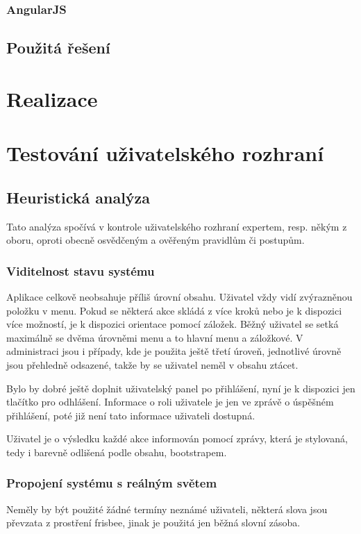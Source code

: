 \documentclass[thesis=B,czech]{FITthesis}[2012/06/26]
\begin{document}
		\subsection{AngularJS}

	\section{Použitá řešení}

\chapter{Realizace}

\chapter{Testování uživatelského rozhraní}
	
	\section{Heuristická analýza}
		Tato analýza spočívá v kontrole uživatelského rozhraní expertem, resp. někým z oboru, oproti obecně osvědčeným a ověřeným pravidlům či postupům. 

		\subsection{Viditelnost stavu systému}
			Aplikace celkově neobsahuje příliš úrovní obsahu. Uživatel vždy vidí zvýrazněnou položku v menu. Pokud se některá akce skládá z více kroků nebo je k dispozici více možností, je k dispozici orientace pomocí záložek. Běžný uživatel se setká maximálně se dvěma úrovněmi menu a to hlavní menu a záložkové. V administraci jsou i případy, kde je použita ještě třetí úroveň, jednotlivé úrovně jsou přehledně odsazené, takže by se uživatel neměl v obsahu ztácet.

			Bylo by dobré ještě doplnit uživatelský panel po přihlášení, nyní je k dispozici jen tlačítko pro odhlášení. Informace o roli uživatele je jen ve zprávě o úspěšném přihlášení, poté již není tato informace uživateli dostupná.

			Uživatel je o výsledku každé akce informován pomocí zprávy, která je stylovaná, tedy i barevně odlišená podle obsahu, bootstrapem.

		\subsection{Propojení systému s reálným světem}
			Neměly by být použité žádné termíny neznámé uživateli, některá slova jsou převzata z prostření frisbee, jinak je použitá jen běžná slovní zásoba.
\end{document}
